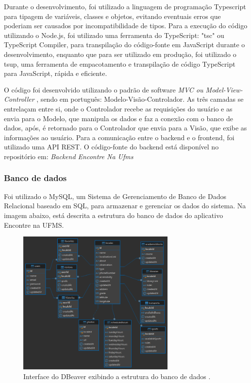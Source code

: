     Durante o desenvolvimento, foi utilizado a linguagem de programação Typescript para tipagem de variáveis, classes e objetos, evitando eventuais erros que poderiam ser causados por incompatibilidade de tipos. Para a execução do código utilizando o Node.js, foi utilizado uma ferramenta do TypeScript: "tsc" ou TypeScript Compiler, para transpilação do código-fonte em JavaScript durante o desenvolvimento, enquanto que para ser utilizado em produção, foi utilizado o tsup, uma ferramenta de empacotamento e transpilação de código TypeScript para JavaScript, rápida e eficiente.

    O código foi desenvolvido utilizando o padrão de software \textit{MVC ou Model-View-Controller} \cite{mvc}, sendo em português: Modelo-Visão-Controlador. As três camadas se entrelaçam entre si, onde o Controlador recebe as requisições do usuário e as envia para o Modelo, que manipula os dados e faz a conexão com o banco de dados, após, é retornado para o Controlador que envia para a Visão, que exibe as informações ao usuário. Para a comunicação entre o backend e o frontend, foi utilizado uma API REST. O código-fonte do backend está disponível no repositório em: \textit{Backend Encontre Na Ufms} \cite{backend}

\subsubsection{Banco de dados}
    
    Foi utilizado o MySQL, um Sistema de Gerenciamento de Banco de Dados Relacional baseado em SQL, para armazenar e gerenciar os dados do sistema.  Na imagem abaixo, está descrita a estrutura do banco de dados do aplicativo Encontre na UFMS.

\begin{figure}[h]
    \centering
    \includegraphics[width=0.7\textwidth]{imagens/encontrenaufms.png}
    \caption{\scriptsize Interface do DBeaver exibindo a estrutura do banco de dados \cite{dbeaver}.}
    \label{fig:descricaoBancoDeDados}
\end{figure}

